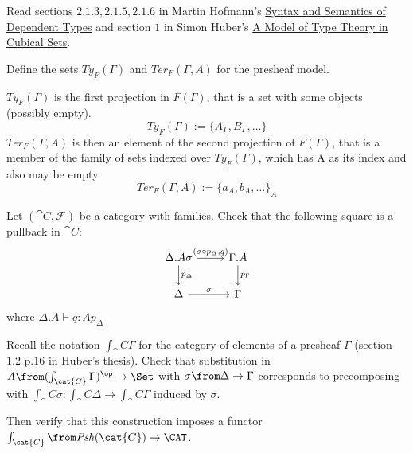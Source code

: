 \def\pathToRoot{../../}



\author{Nikita Ziuzin}

\begin{hint}
  Read sections $2.1.3, 2.1.5, 2.1.6$ in Martin Hofmann's \href{http://www.irif.fr/~mellies/mpri/mpri-ens/articles/hofmann-syntax-and-semantics-of-dependent-types.pdf}{Syntax and Semantics of Dependent Types} and section $1$ in Simon Huber's \href{http://www.cse.chalmers.se/~simonhu/misc/lic.pdf}{A Model of Type Theory in Cubical Sets}.
\end{hint}

\begin{exercise}
  Define the sets $\mathit{Ty}_F(\Gamma)$ and $\mathit{Ter}_F(\Gamma, A)$ for
  the presheaf model.
\end{exercise}
\begin{answer}
  $\mathit{Ty}_F(\Gamma)$ is the first projection in $F(\Gamma)$, that is a set
  with some objects (possibly empty).
  \[
    \mathit{Ty}_F(\Gamma) := \{A_\Gamma, B_\Gamma, \dots\}
  \]
  $\mathit{Ter}_F(\Gamma, A)$ is then an element of the second projection of
  $F(\Gamma)$, that is a member of the family of sets indexed over
  $\mathit{Ty}_F(\Gamma)$, which has A as its index and also may be empty.
  \[
    \mathit{Ter}_F(\Gamma, A) := \{a_A, b_A, \dots\}_A
  \]
\end{answer}

\begin{exercise}
  Let $(\cat C, \mathcal F)$ be a category with families.  Check that the
  following square is a pullback in $\cat{C}$:
  \[
    \begin{tikzcd}
      \Delta.A\sigma \arrow{r}{(\sigma \circ p_\Delta, q)} \arrow{d}{p_\Delta} & \Gamma.A \arrow{d}{p_\Gamma}\\
      \Delta \arrow{r}{\sigma} & \Gamma
    \end{tikzcd}
  \]
  where $\Delta.A \vdash q : A p_\Delta$
\end{exercise}

\begin{exercise}
  Recall the notation $\int_\cat{C}\Gamma$ for the category of elements of a
  presheaf $\Gamma$ (section $1.2$ p.$16$ in Huber's thesis).  Check that
  substitution in $A\from (\int_\cat{C}\Gamma)^\op \to \Set$ with $\sigma \from
  \Delta \to \Gamma$ corresponds to precomposing with $\int_\cat{C} \sigma :
  \int_\cat{C} \Delta \to \int_\cat{C} \Gamma$ induced by $\sigma$.

  Then verify that this construction imposes a functor $\int_\cat{C} \from
  \mathit{Psh}(\cat{C}) \to \CAT$.
\end{exercise}
\begin{answer}
\end{answer}

